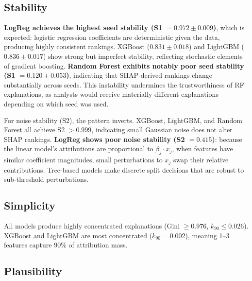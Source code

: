 \documentclass[12pt,a4paper]{report}
\begin{document}
\subsection{Stability}
\label{sec:stab-results}

\textbf{LogReg achieves the highest seed stability (S1 $= 0.972 \pm 0.009$)}, which is expected: logistic regression coefficients are deterministic given the data, producing highly consistent rankings. XGBoost ($0.831 \pm 0.018$) and LightGBM ($0.836 \pm 0.017$) show strong but imperfect stability, reflecting stochastic elements of gradient boosting. \textbf{Random Forest exhibits notably poor seed stability (S1 $= 0.120 \pm 0.053$)}, indicating that SHAP-derived rankings change substantially across seeds. This instability undermines the trustworthiness of RF explanations, as analysts would receive materially different explanations depending on which seed was used.

For noise stability (S2), the pattern inverts. XGBoost, LightGBM, and Random Forest all achieve S2 $> 0.999$, indicating small Gaussian noise does not alter SHAP rankings. \textbf{LogReg shows poor noise stability (S2 $= 0.415$)}: because the linear model's attributions are proportional to $\beta_j \cdot x_j$, when features have similar coefficient magnitudes, small perturbations to $x_j$ swap their relative contributions. Tree-based models make discrete split decisions that are robust to sub-threshold perturbations.

\subsection{Simplicity}
\label{sec:simp-results}

All models produce highly concentrated explanations (Gini $\geq 0.976$, $k_{90} \leq 0.026$). XGBoost and LightGBM are most concentrated ($k_{90} = 0.002$), meaning 1--3 features capture 90\% of attribution mass.

\subsection{Plausibility}
\label{sec:plaus-results}
\end{document}
